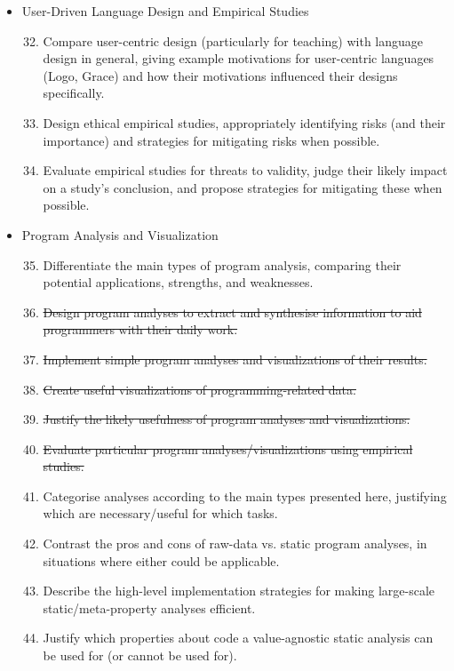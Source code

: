 \documentclass{article}
\begin{document}
\begin{itemize}
    \item User-Driven Language Design and Empirical Studies
    \begin{enumerate}
        \setcounter{enumi}{31}
        \item Compare user-centric design (particularly for teaching) with language design in general, giving example motivations for user-centric languages (Logo, Grace) and how their motivations influenced their designs specifically.
        \item Design ethical empirical studies, appropriately identifying risks (and their importance) and strategies for mitigating risks when possible.
        \item Evaluate empirical studies for threats to validity, judge their likely impact on a study's conclusion, and propose strategies for mitigating these when possible.
    \end{enumerate}
    \item Program Analysis and Visualization
    \begin{enumerate}
        \setcounter{enumi}{34}
        \item Differentiate the main types of program analysis, comparing their potential applications, strengths, and weaknesses.
        \item \sout{Design program analyses to extract and synthesise information to aid programmers with their daily work.}
        \item \sout{Implement simple program analyses and visualizations of their results.}
        \item \sout{Create useful visualizations of programming-related data.}
        \item \sout{Justify the likely usefulness of program analyses and visualizations.}
        \item \sout{Evaluate particular program analyses/visualizations using empirical studies.}
        \item Categorise analyses according to the main types presented here, justifying which are necessary/useful for which tasks.
        \item Contrast the pros and cons of raw-data vs. static program analyses, in situations where either could be applicable.
        \item Describe the high-level implementation strategies for making large-scale static/meta-property analyses efficient.
        \item Justify which properties about code a value-agnostic static analysis can be used for (or cannot be used for).

\end{enumerate}
\end{itemize}
\end{document}

